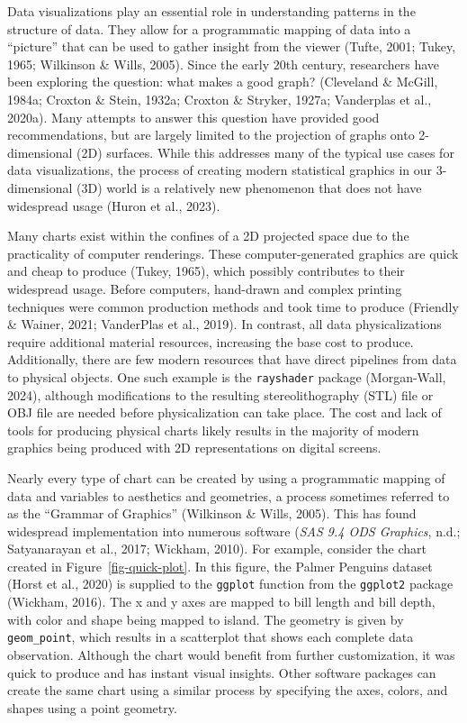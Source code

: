\documentclass[phd]{nuthesis}
\begin{document}
Data visualizations play an essential role in understanding patterns in
the structure of data. They allow for a programmatic mapping of data
into a ``picture'' that can be used to gather insight from the viewer
(Tufte, 2001; Tukey, 1965; Wilkinson \& Wills, 2005). Since the early
20th century, researchers have been exploring the question: what makes a
good graph? (Cleveland \& McGill, 1984a; Croxton \& Stein, 1932a;
Croxton \& Stryker, 1927a; Vanderplas et al., 2020a). Many attempts to
answer this question have provided good recommendations, but are largely
limited to the projection of graphs onto 2-dimensional (2D) surfaces.
While this addresses many of the typical use cases for data
visualizations, the process of creating modern statistical graphics in
our 3-dimensional (3D) world is a relatively new phenomenon that does
not have widespread usage (Huron et al., 2023).

Many charts exist within the confines of a 2D projected space due to the
practicality of computer renderings. These computer-generated graphics
are quick and cheap to produce (Tukey, 1965), which possibly contributes
to their widespread usage. Before computers, hand-drawn and complex
printing techniques were common production methods and took time to
produce (Friendly \& Wainer, 2021; VanderPlas et al., 2019). In
contrast, all data physicalizations require additional material
resources, increasing the base cost to produce. Additionally, there are
few modern resources that have direct pipelines from data to physical
objects. One such example is the \texttt{rayshader} package
(Morgan-Wall, 2024), although modifications to the resulting
stereolithography (STL) file or OBJ file are needed before
physicalization can take place. The cost and lack of tools for producing
physical charts likely results in the majority of modern graphics being
produced with 2D representations on digital screens.

Nearly every type of chart can be created by using a programmatic
mapping of data and variables to aesthetics and geometries, a process
sometimes referred to as the ``Grammar of Graphics'' (Wilkinson \&
Wills, 2005). This has found widespread implementation into numerous
software (\emph{SAS 9.4 ODS Graphics}, n.d.; Satyanarayan et al., 2017;
Wickham, 2010). For example, consider the chart created in
Figure~\ref{fig-quick-plot}. In this figure, the Palmer Penguins dataset
(Horst et al., 2020) is supplied to the \texttt{ggplot} function from
the \texttt{ggplot2} package (Wickham, 2016). The x and y axes are
mapped to bill length and bill depth, with color and shape being mapped
to island. The geometry is given by \texttt{geom\_point}, which results
in a scatterplot that shows each complete data observation. Although the
chart would benefit from further customization, it was quick to produce
and has instant visual insights. Other software packages can create the
same chart using a similar process by specifying the axes, colors, and
shapes using a point geometry.
\end{document}
